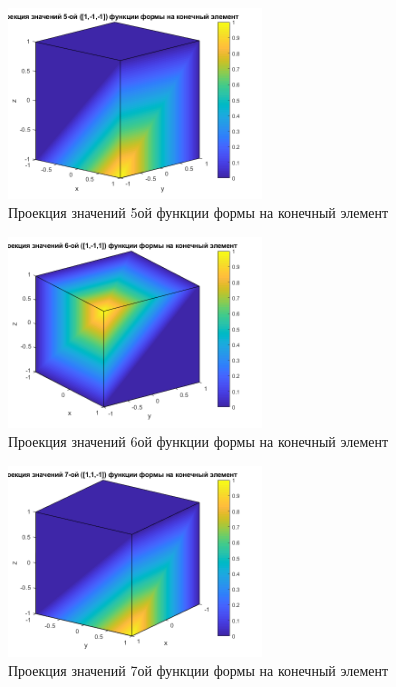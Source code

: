 \documentclass[]{article}
\begin{document}
			\begin{center}
				\begin{figure}[H]
					\centering
					\includegraphics[width=0.6\textwidth]{5}
					\caption{Проекция значений 5ой функции формы на конечный элемент}
					\label{рис. 7}
				\end{figure}
			\end{center}
		
			\begin{center}
				\begin{figure}[H]
					\centering
					\includegraphics[width=0.6\textwidth]{6}
					\caption{Проекция значений 6ой функции формы на конечный элемент}
					\label{рис. 8}
				\end{figure}
			\end{center}
			
			\begin{center}
				\begin{figure}[H]
					\centering
					\includegraphics[width=0.6\textwidth]{7}
					\caption{Проекция значений 7ой функции формы на конечный элемент}
					\label{рис. 9}
				\end{figure}
			\end{center}
			
\end{document}
